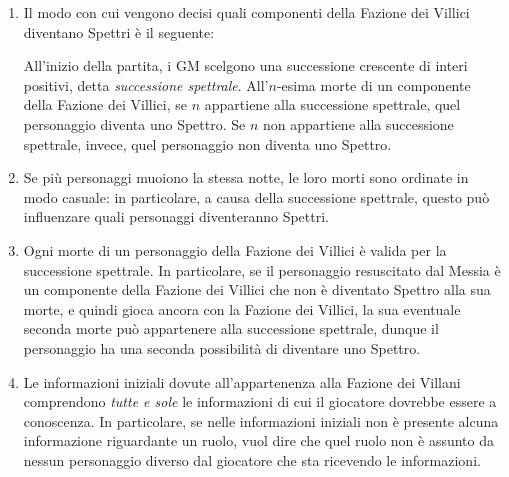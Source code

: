\documentclass[a4paper,10pt]{article}
\begin{document}
\begin{enumerate}
	\item Il modo con cui vengono decisi quali componenti della Fazione dei Villici diventano Spettri è il seguente:
	
	All'inizio della partita, i GM scelgono una successione crescente di interi positivi, detta \emph{successione spettrale}. All'$n$-esima morte di un componente della Fazione dei Villici, se $n$ appartiene alla successione spettrale, quel personaggio diventa uno Spettro. Se $n$ non appartiene alla successione spettrale, invece, quel personaggio non diventa uno Spettro.
	
	\item Se più personaggi muoiono la stessa notte, le loro morti sono ordinate in modo casuale: in particolare, a causa della successione spettrale, questo può influenzare quali personaggi diventeranno Spettri.
	
	\item Ogni morte di un personaggio della Fazione dei Villici è valida per la successione spettrale. In particolare, se il personaggio resuscitato dal Messia è un componente della Fazione dei Villici che non è diventato Spettro alla sua morte, e quindi gioca ancora con la Fazione dei Villici, la sua eventuale seconda morte può appartenere alla successione spettrale, dunque il personaggio ha una seconda possibilità di diventare uno Spettro.
	
	\item Le informazioni iniziali dovute all'appartenenza alla Fazione dei Villani comprendono \emph{tutte e sole} le informazioni di cui il giocatore dovrebbe essere a conoscenza. In particolare, se nelle informazioni iniziali non è presente alcuna informazione riguardante un ruolo, vuol dire che quel ruolo non è assunto da nessun personaggio diverso dal giocatore che sta ricevendo le informazioni.
	
	

\end{enumerate}
\end{document}
